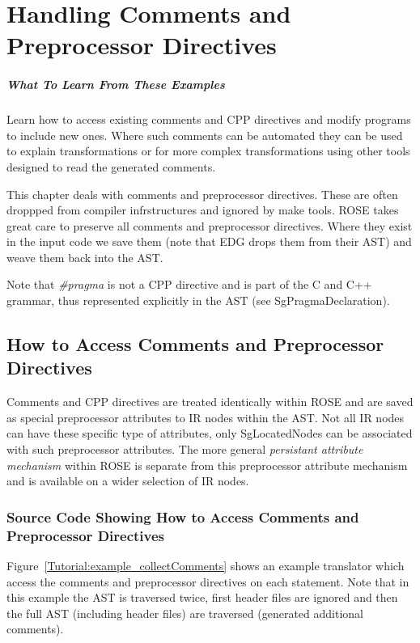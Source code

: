 \chapter{Handling Comments and Preprocessor Directives}

\paragraph{What To Learn From These Examples}
Learn how to access existing comments and CPP directives
and modify programs to include new ones. Where such comments 
can be automated they can be used to explain transformations 
or for more complex transformations using other tools
designed to read the generated comments.

   This chapter deals with comments and preprocessor directives.
These are often droppped from compiler infrstructures and ignored
by make tools.  ROSE takes great care to preserve all comments and
preprocessor directives.  Where they exist in the input code we 
save them (note that EDG drops them from their AST) and weave them
back into the AST.  

Note that {\it \#pragma} is not a CPP directive and is part of the
C and C++ grammar, thus represented explicitly in the AST (see SgPragmaDeclaration).

\section{How to Access Comments and Preprocessor Directives}

   Comments and CPP directives are treated identically within ROSE and are 
saved as special preprocessor attributes to IR nodes within the AST.
Not all IR nodes can have these specific type of attributes, only 
SgLocatedNodes can be associated with such preprocessor attributes.
The more general {\it persistant attribute mechanism} within ROSE is separate from this
preprocessor attribute mechanism and is available on a wider selection of IR nodes.

\subsection{Source Code Showing How to Access Comments and Preprocessor Directives}

    Figure~\ref{Tutorial:example_collectComments}
shows an example translator which access the comments and preprocessor directives on each
statement. Note that in this example the AST is traversed twice, first header files are
ignored and then the full AST (including header files) are traversed (generated additional
comments).

